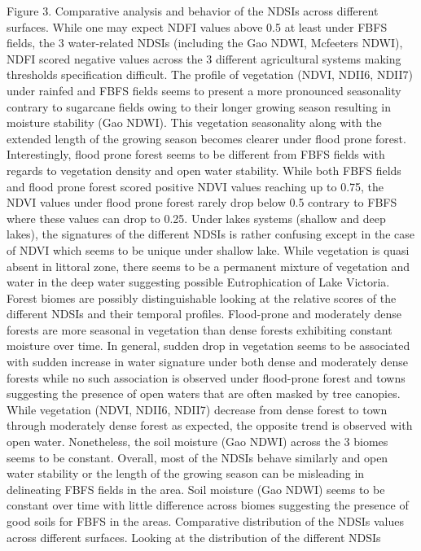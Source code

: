 \documentclass[12pt,oneside]{article}
\begin{document}
Figure 3. Comparative analysis and behavior of the NDSIs across
different surfaces. While one may expect NDFI values above 0.5 at least
under FBFS fields, the 3 water-related NDSIs (including the Gao NDWI,
Mcfeeters NDWI), NDFI scored negative values across the 3 different
agricultural systems making thresholds specification difficult. The
profile of vegetation (NDVI, NDII6, NDII7) under rainfed and FBFS fields
seems to present a more pronounced seasonality contrary to sugarcane
fields owing to their longer growing season resulting in moisture
stability (Gao NDWI). This vegetation seasonality along with the
extended length of the growing season becomes clearer under flood prone
forest. Interestingly, flood prone forest seems to be different from
FBFS fields with regards to vegetation density and open water stability.
While both FBFS fields and flood prone forest scored positive NDVI
values reaching up to 0.75, the NDVI values under flood prone forest
rarely drop below 0.5 contrary to FBFS where these values can drop to
0.25. Under lakes systems (shallow and deep lakes), the signatures of
the different NDSIs is rather confusing except in the case of NDVI which
seems to be unique under shallow lake. While vegetation is quasi absent
in littoral zone, there seems to be a permanent mixture of vegetation
and water in the deep water suggesting possible Eutrophication of Lake
Victoria. Forest biomes are possibly distinguishable looking at the
relative scores of the different NDSIs and their temporal profiles.
Flood-prone and moderately dense forests are more seasonal in vegetation
than dense forests exhibiting constant moisture over time. In general,
sudden drop in vegetation seems to be associated with sudden increase in
water signature under both dense and moderately dense forests while no
such association is observed under flood-prone forest and towns
suggesting the presence of open waters that are often masked by tree
canopies. While vegetation (NDVI, NDII6, NDII7) decrease from dense
forest to town through moderately dense forest as expected, the opposite
trend is observed with open water. Nonetheless, the soil moisture (Gao
NDWI) across the 3 biomes seems to be constant. Overall, most of the
NDSIs behave similarly and open water stability or the length of the
growing season can be misleading in delineating FBFS fields in the area.
Soil moisture (Gao NDWI) seems to be constant over time with little
difference across biomes suggesting the presence of good soils for FBFS
in the areas. Comparative distribution of the NDSIs values across
different surfaces. Looking at the distribution of the different NDSIs
\end{document}
